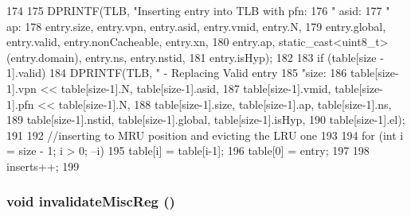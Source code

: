 \begin{DoxyCode}
174 {
175     DPRINTF(TLB, "Inserting entry into TLB with pfn:%
176             " asid:%
177             " ap:%
178             entry.size, entry.vpn, entry.asid, entry.vmid, entry.N,
179             entry.global, entry.valid, entry.nonCacheable, entry.xn,
180             entry.ap, static_cast<uint8_t>(entry.domain), entry.ns, entry.nstid,
181             entry.isHyp);
182 
183     if (table[size - 1].valid)
184         DPRINTF(TLB, " - Replacing Valid entry %
185                 "size: %
186                 table[size-1].vpn << table[size-1].N, table[size-1].asid,
187                 table[size-1].vmid, table[size-1].pfn << table[size-1].N,
188                 table[size-1].size, table[size-1].ap, table[size-1].ns,
189                 table[size-1].nstid, table[size-1].global, table[size-1].isHyp,
190                 table[size-1].el);
191 
192     //inserting to MRU position and evicting the LRU one
193 
194     for (int i = size - 1; i > 0; --i)
195         table[i] = table[i-1];
196     table[0] = entry;
197 
198     inserts++;
199 }
\end{DoxyCode}
\hypertarget{classArmISA_1_1TLB_a97b2a677e1ca5219c876aa978a853c15}{
\subsubsection[{invalidateMiscReg}]{\setlength{\rightskip}{0pt plus 5cm}void invalidateMiscReg ()}}
\label{classArmISA_1_1TLB_a97b2a677e1ca5219c876aa978a853c15}



